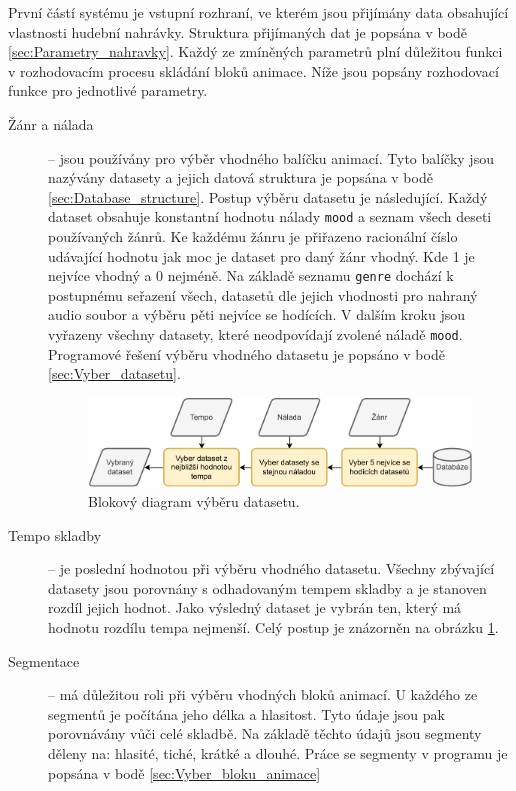 První částí systému je vstupní rozhraní, ve kterém jsou přijímány data obsahující vlastnosti hudební nahrávky. Struktura přijímaných dat je popsána v bodě \ref{sec:Parametry_nahravky}. Každý ze zmíněných parametrů plní důležitou funkci v rozhodovacím procesu skládání bloků animace. Níže jsou popsány rozhodovací funkce pro jednotlivé parametry.

\begin{description}
    \item[Žánr a nálada] -- jsou používány pro výběr vhodného balíčku animací. Tyto balíčky jsou nazývány datasety a jejich datová struktura je popsána v bodě \ref{sec:Database_structure}. Postup výběru datasetu je následující. Každý dataset obsahuje konstantní hodnotu nálady \texttt{mood} a seznam všech deseti používaných žánrů. Ke každému žánru je přiřazeno racionální číslo udávající hodnotu jak moc je dataset pro daný žánr vhodný. Kde 1 je nejvíce vhodný a 0 nejméně. Na základě seznamu \texttt{genre} dochází k postupnému seřazení všech, datasetů dle jejich vhodnosti pro nahraný audio soubor a výběru pěti nejvíce se hodících. V dalším kroku jsou vyřazeny všechny datasety, které neodpovídají zvolené náladě \texttt{mood}. Programové řešení výběru vhodného datasetu je popsáno v bodě \ref{sec:Vyber_datasetu}.
    
    \begin{figure}[H]
        \centering
        \includegraphics[width = 1\linewidth]{obrazky/Dataset_selection_diagram.pdf}
        \caption{Blokový diagram výběru datasetu.}
        \label{fig:Dataset_selection_diagram}
    \end{figure}

    \item[Tempo skladby] -- je poslední hodnotou při výběru vhodného datasetu.    Všechny zbývající datasety jsou porovnány s odhadovaným tempem skladby a je stanoven rozdíl jejich hodnot. Jako výsledný dataset je vybrán ten, který má hodnotu rozdílu tempa nejmenší. Celý postup je znázorněn na obrázku \ref{fig:Dataset_selection_diagram}.
    
    \item[Segmentace] -- má důležitou roli při výběru vhodných bloků animací. U každého ze segmentů je počítána jeho délka a hlasitost. Tyto údaje jsou pak porovnávány vůči celé skladbě. Na základě těchto údajů jsou segmenty děleny na: hlasité, tiché, krátké a dlouhé. Práce se segmenty v programu je popsána v bodě \ref{sec:Vyber_bloku_animace}


\end{description}
